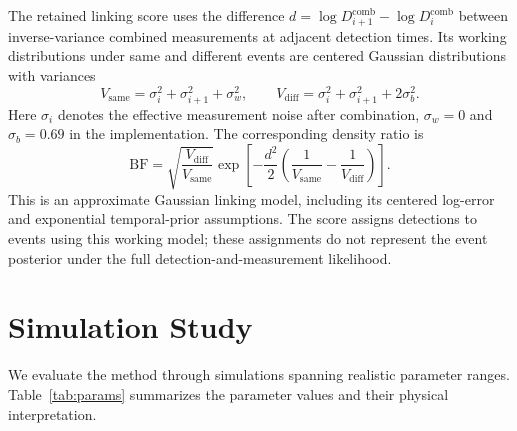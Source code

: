 \documentclass[11pt]{article}
\begin{document}
The retained linking score uses the difference $d=\log D_{i+1}^{\mathrm{comb}}-\log D_i^{\mathrm{comb}}$ between inverse-variance combined measurements at adjacent detection times. Its working distributions under same and different events are centered Gaussian distributions with variances
\begin{equation}
 V_{\mathrm{same}}=\sigma_i^2+\sigma_{i+1}^2+\sigma_w^2,\qquad
 V_{\mathrm{diff}}=\sigma_i^2+\sigma_{i+1}^2+2\sigma_b^2.
\end{equation}
Here $\sigma_i$ denotes the effective measurement noise after combination, $\sigma_w=0$ and $\sigma_b=0.69$ in the implementation. The corresponding density ratio is
\begin{equation}
 \mathrm{BF}=\sqrt{\frac{V_{\mathrm{diff}}}{V_{\mathrm{same}}}}
 \exp\!\left[-\frac{d^2}{2}\left(\frac1{V_{\mathrm{same}}}-\frac1{V_{\mathrm{diff}}}\right)\right].
\end{equation}
This is an approximate Gaussian linking model, including its centered log-error and exponential temporal-prior assumptions. The score assigns detections to events using this working model; these assignments do not represent the event posterior under the full detection-and-measurement likelihood.


\section{Simulation Study}
\label{sec:simulation}

We evaluate the method through simulations spanning realistic parameter ranges. Table~\ref{tab:params} summarizes the parameter values and their physical interpretation.
\end{document}
